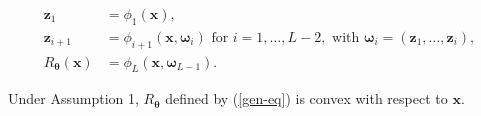 \documentclass[10pt,a4paper]{amsart}
\begin{document}
\begin{equation}\label{gen-eq}
\tag{EQ-G}
\begin{aligned}
    \mathbf{z}_{1} &= \phi_{1}(\mathbf{x}),\\
    \mathbf{z}_{i+1} &= \phi_{i+1}(\mathbf{x},\boldsymbol{\omega}_i)\text{ for }i=1,\dots,L-2, \text{ with }\boldsymbol{\omega}_i=(\mathbf{z}_1,\dots,\mathbf{z}_i),\\ 
    R_{\boldsymbol{\theta}}(\mathbf{x})&=\phi_L(\mathbf{x},\boldsymbol{\omega}_{L-1}).
\end{aligned}
\end{equation}

\begin{proposition}\label{cvx}
Under Assumption 1, $R_{\boldsymbol{\theta}}$ defined by (\ref{gen-eq}) is convex with respect to $\mathbf{x}$.
\end{proposition}
\end{document}

